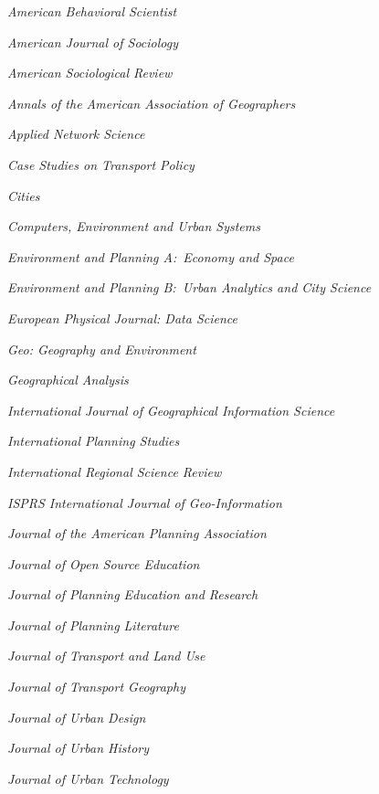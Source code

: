 \documentclass[11pt,letterpaper]{report}
\newcommand{\listitemspace}{0.25em}
\renewenvironment{itemize}
{\begin{list}{}{\setlength{\leftmargin}{0em}
                \setlength{\parskip}{0em}
                \setlength{\itemsep}{\listitemspace}
                \setlength{\parsep}{\listitemspace}}}
{\end{list}}
\begin{document}
    \begin{itemize}

        \item \textit{American Behavioral Scientist}
        \item \textit{American Journal of Sociology}
        \item \textit{American Sociological Review}
        \item \textit{Annals of the American Association of Geographers}
        \item \textit{Applied Network Science}
        \item \textit{Case Studies on Transport Policy}
        \item \textit{Cities}
        \item \textit{Computers, Environment and Urban Systems}
        \item \textit{Environment and Planning A:\ Economy and Space}
        \item \textit{Environment and Planning B:\ Urban Analytics and City Science}
        \item \textit{European Physical Journal: Data Science}
        \item \textit{Geo: Geography and Environment}
        \item \textit{Geographical Analysis}
        \item \textit{International Journal of Geographical Information Science}
        \item \textit{International Planning Studies}
        \item \textit{International Regional Science Review}
        \item \textit{ISPRS International Journal of Geo-Information}
        \item \textit{Journal of the American Planning Association}
        \item \textit{Journal of Open Source Education}
        \item \textit{Journal of Planning Education and Research}
        \item \textit{Journal of Planning Literature}
        \item \textit{Journal of Transport and Land Use}
        \item \textit{Journal of Transport Geography}
        \item \textit{Journal of Urban Design}
        \item \textit{Journal of Urban History}
        \item \textit{Journal of Urban Technology}

\end{itemize}
\end{document}
